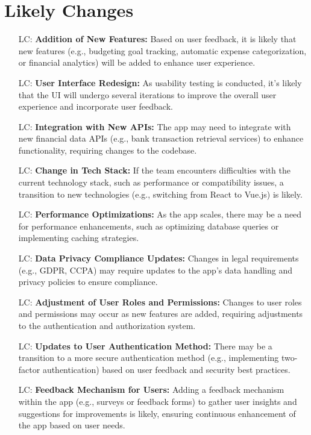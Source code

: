 \documentclass[12pt]{article}
\newcounter{lcnum} %
\begin{document}
\newpage 

\section{Likely Changes}    

\noindent \begin{itemize}
	\item[LC\refstepcounter{lcnum}\thelcnum\label{Addition of New Features}:] \textbf{Addition of New Features:} Based on user feedback, it is likely that new features (e.g., budgeting goal tracking, automatic expense categorization, or financial analytics) will be added to enhance user experience.
	\item[LC\refstepcounter{lcnum}\thelcnum\label{User Interface Redesign}:] \textbf{User Interface Redesign:} As usability testing is conducted, it's likely that the UI will undergo several iterations to improve the overall user experience and incorporate user feedback.
	\item[LC\refstepcounter{lcnum}\thelcnum\label{Integration with New APIs}:] \textbf{Integration with New APIs:} The app may need to integrate with new financial data APIs (e.g., bank transaction retrieval services) to enhance functionality, requiring changes to the codebase.
	\item[LC\refstepcounter{lcnum}\thelcnum\label{Change in Tech Stack}:] \textbf{Change in Tech Stack:} If the team encounters difficulties with the current technology stack, such as performance or compatibility issues, a transition to new technologies (e.g., switching from React to Vue.js) is likely.
	\item[LC\refstepcounter{lcnum}\thelcnum\label{Performance Optimizations}:] \textbf{Performance Optimizations:} As the app scales, there may be a need for performance enhancements, such as optimizing database queries or implementing caching strategies.
	\item[LC\refstepcounter{lcnum}\thelcnum\label{Data Privacy Compliance Updates}:] \textbf{Data Privacy Compliance Updates:} Changes in legal requirements (e.g., GDPR, CCPA) may require updates to the app's data handling and privacy policies to ensure compliance.
	\item[LC\refstepcounter{lcnum}\thelcnum\label{Adjustment of User Roles and Permissions}:] \textbf{Adjustment of User Roles and Permissions:} Changes to user roles and permissions may occur as new features are added, requiring adjustments to the authentication and authorization system.
	\item[LC\refstepcounter{lcnum}\thelcnum\label{Updates to User Authentication Method}:] \textbf{Updates to User Authentication Method:} There may be a transition to a more secure authentication method (e.g., implementing two-factor authentication) based on user feedback and security best practices.
	\item[LC\refstepcounter{lcnum}\thelcnum\label{Feedback Mechanism for Users}:] \textbf{Feedback Mechanism for Users:} Adding a feedback mechanism within the app (e.g., surveys or feedback forms) to gather user insights and suggestions for improvements is likely, ensuring continuous enhancement of the app based on user needs.
\end{itemize}
\end{document}
